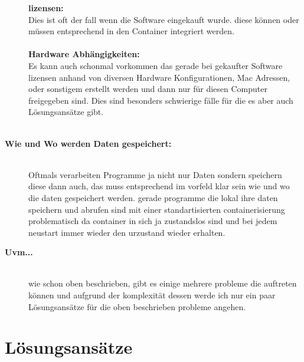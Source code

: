 \begin{description}
	\textbf{lizensen:} \\ Dies ist oft der fall wenn die Software eingekauft wurde. diese können oder müssen entsprechend in den Container integriert werden. \\ \\
	\textbf{Hardware Abhängigkeiten:} \\ Es kann auch schonmal vorkommen das gerade bei gekaufter Software lizensen anhand von diversen Hardware Konfigurationen, Mac Adressen, oder sonstigem erstellt werden und dann nur für diesen Computer freigegeben sind. Dies sind besonders schwierige fälle für die es aber auch Lösungsansätze gibt. \\ \\

	\item[\textbf{Wie und Wo werden Daten gespeichert:}]\hfill \\ Oftmals verarbeiten Programme ja nicht nur Daten sondern speichern diese dann auch, das muss entsprechend im vorfeld klar sein wie und wo die daten gespeichert werden. gerade programme die lokal ihre daten speichern und abrufen sind mit einer standartisierten containerisierung problematisch da container in sich ja zustandslos sind und bei jedem neustart immer wieder den urzustand wieder erhalten. \\
	\item[\textbf{Uvm...}]\hfill \\ wie schon oben beschrieben, gibt es einige mehrere probleme die auftreten können und aufgrund der komplexität dessen werde ich nur ein paar Lösungsansätze für die oben beschrieben probleme angehen. \\
\end{description}

\section{Lösungsansätze}

